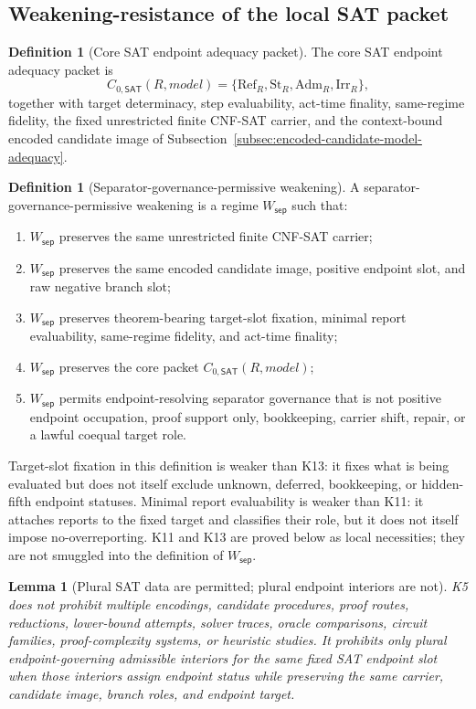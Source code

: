 \documentclass[11pt]{article}
\newtheorem{lemma}[theorem]{Lemma}
\theoremstyle{definition}
\newtheorem{definition}[theorem]{Definition}
\theoremstyle{remark}
\newcommand{\Adm}{\mathrm{Adm}}
\newcommand{\St}{\mathrm{St}}
\newcommand{\RefK}{\mathrm{Ref}}
\newcommand{\Irr}{\mathrm{Irr}}
\newcommand{\CoreSAT}{C_{0,\mathsf{SAT}}}
\newcommand{\WeakSep}{W_{\mathsf{sep}}}
\begin{document}
\subsection{Weakening-resistance of the local SAT packet}

\begin{definition}[Core SAT endpoint adequacy packet]\label{def:core-sat-endpoint-adequacy}
The core SAT endpoint adequacy packet is
\[
  \CoreSAT(R,model)=\{\RefK_R,\St_R,\Adm_R,\Irr_R\},
\]
together with target determinacy, step evaluability, act-time finality, same-regime fidelity, the fixed unrestricted finite CNF-SAT carrier, and the context-bound encoded candidate image of Subsection~\ref{subsec:encoded-candidate-model-adequacy}.
\end{definition}

\begin{definition}[Separator-governance-permissive weakening]\label{def:separator-governance-permissive-weakening}
A separator-governance-permissive weakening is a regime \(\WeakSep\) such that:
\begin{enumerate}
\item \(\WeakSep\) preserves the same unrestricted finite CNF-SAT carrier;
\item \(\WeakSep\) preserves the same encoded candidate image, positive endpoint slot, and raw negative branch slot;
\item \(\WeakSep\) preserves theorem-bearing target-slot fixation, minimal report evaluability, same-regime fidelity, and act-time finality;
\item \(\WeakSep\) preserves the core packet \(\CoreSAT(R,model)\);
\item \(\WeakSep\) permits endpoint-resolving separator governance that is not positive endpoint occupation, proof support only, bookkeeping, carrier shift, repair, or a lawful coequal target role.
\end{enumerate}
Target-slot fixation in this definition is weaker than K13: it fixes what is being evaluated but does not itself exclude unknown, deferred, bookkeeping, or hidden-fifth endpoint statuses. Minimal report evaluability is weaker than K11: it attaches reports to the fixed target and classifies their role, but it does not itself impose no-overreporting. K11 and K13 are proved below as local necessities; they are not smuggled into the definition of \(\WeakSep\).
\end{definition}

\begin{lemma}[Plural SAT data are permitted; plural endpoint interiors are not]\label{lem:plural-sat-data-not-plural-interiors}
K5 does not prohibit multiple encodings, candidate procedures, proof routes, reductions, lower-bound attempts, solver traces, oracle comparisons, circuit families, proof-complexity systems, or heuristic studies. It prohibits only plural endpoint-governing admissible interiors for the same fixed SAT endpoint slot when those interiors assign endpoint status while preserving the same carrier, candidate image, branch roles, and endpoint target.
\end{lemma}
\end{document}
